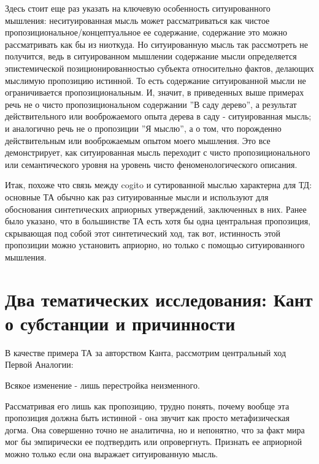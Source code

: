 \documentclass{article}
\begin{document}
Здесь стоит еще раз указать на ключевую особенность ситуированного мышления: неситуированная мысль может рассматриваться как чистое пропозициональное/концептуальное ее содержание, содержание это можно рассматривать как бы из ниоткуда. Но ситуированную мысль так рассмотреть не получится, ведь в ситуированном мышлении содержание мысли определяется эпистемической позиционированностью субъекта относительно фактов, делающих мыслимую пропозицию истинной. То есть содержание ситуированной мысли не ограничивается пропозициональным. И, значит, в приведенных выше примерах речь не о чисто пропозициональном содержании ''В саду дерево'', а результат действительного или вооброжаемого опыта дерева в саду - ситуированная мысль; и аналогично речь не о пропозиции ''Я мыслю'', а о том, что порожденно действительным или вооброжаемым опытом моего мышления. Это все демонстрирует, как ситуированная мысль переходит с чисто пропозиционального или семантического уровня на уровень чисто феноменологического описания.

Итак, похоже что связь между cogito и сутированной мыслью характерна для ТД: основные ТА обычно как раз ситуированные мысли и используют для обоснования синтетических априорных утверждений, заключенных в них. Ранее было указано, что в большинстве ТА есть хотя бы одна центральная пропозиция, скрывающая под собой этот синтетический ход, так вот, истинность этой пропозиции можно установить априорно, но только с помощью ситуированного мышления.

\section{Два тематических исследования: Кант о субстанции и причинности}

В качестве примера ТА за авторством Канта, рассмотрим центральный ход Первой Аналогии:

Всякое изменение - лишь перестройка неизменного.

Рассматривая его лишь как пропозицию, трудно понять, почему вообще эта пропозиция должна быть истинной - она звучит как просто метафизическая догма. Она совершенно точно не аналитична, но и непонятно, что за факт мира мог бы эмпирически ее подтвердить или опровергнуть. Признать ее априорной можно только если она выражает ситуированную мысль.
\end{document}
